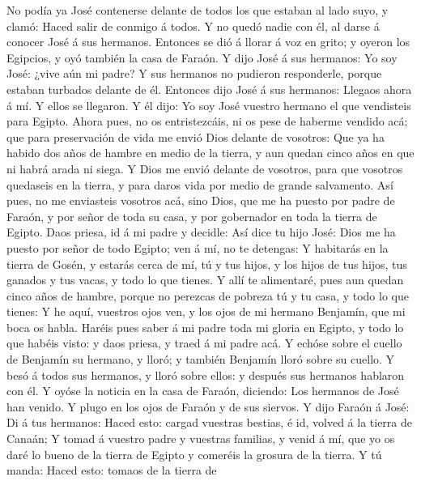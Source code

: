  No podía ya José contenerse delante de todos los que
estaban al lado suyo, y clamó: Haced salir de conmigo á todos. Y no
quedó nadie con él, al darse á conocer José á sus hermanos. 
Entonces se dió á llorar á voz en grito; y oyeron los Egipcios, y oyó
también la casa de Faraón.  Y dijo José á sus hermanos: Yo
soy José: ¿vive aún mi padre? Y sus hermanos no pudieron responderle,
porque estaban turbados delante de él.  Entonces dijo José á
sus hermanos: Llegaos ahora á mí. Y ellos se llegaron. Y él dijo: Yo soy
José vuestro hermano el que vendisteis para Egipto.  Ahora
pues, no os entristezcáis, ni os pese de haberme vendido acá; que para
preservación de vida me envió Dios delante de vosotros:  Que
ya ha habido dos años de hambre en medio de la tierra, y aun quedan
cinco años en que ni habrá arada ni siega.  Y Dios me envió
delante de vosotros, para que vosotros quedaseis en la tierra, y para
daros vida por medio de grande salvamento.  Así pues, no me
enviasteis vosotros acá, sino Dios, que me ha puesto por padre de
Faraón, y por señor de toda su casa, y por gobernador en toda la tierra
de Egipto.  Daos priesa, id á mi padre y decidle: Así dice
tu hijo José: Dios me ha puesto por señor de todo Egipto; ven á mí, no
te detengas:  Y habitarás en la tierra de Gosén, y estarás
cerca de mí, tú y tus hijos, y los hijos de tus hijos, tus ganados y tus
vacas, y todo lo que tienes.  Y allí te alimentaré, pues
aun quedan cinco años de hambre, porque no perezcas de pobreza tú y tu
casa, y todo lo que tienes:  Y he aquí, vuestros ojos ven,
y los ojos de mi hermano Benjamín, que mi boca os habla. 
Haréis pues saber á mi padre toda mi gloria en Egipto, y todo lo que
habéis visto: y daos priesa, y traed á mi padre acá.  Y
echóse sobre el cuello de Benjamín su hermano, y lloró; y también
Benjamín lloró sobre su cuello.  Y besó á todos sus
hermanos, y lloró sobre ellos: y después sus hermanos hablaron con él.
 Y oyóse la noticia en la casa de Faraón, diciendo: Los
hermanos de José han venido. Y plugo en los ojos de Faraón y de sus
siervos.  Y dijo Faraón á José: Di á tus hermanos: Haced
esto: cargad vuestras bestias, é id, volved á la tierra de Canaán;
 Y tomad á vuestro padre y vuestras familias, y venid á mí,
que yo os daré lo bueno de la tierra de Egipto y comeréis la grosura de
la tierra.  Y tú manda: Haced esto: tomaos de la tierra de
